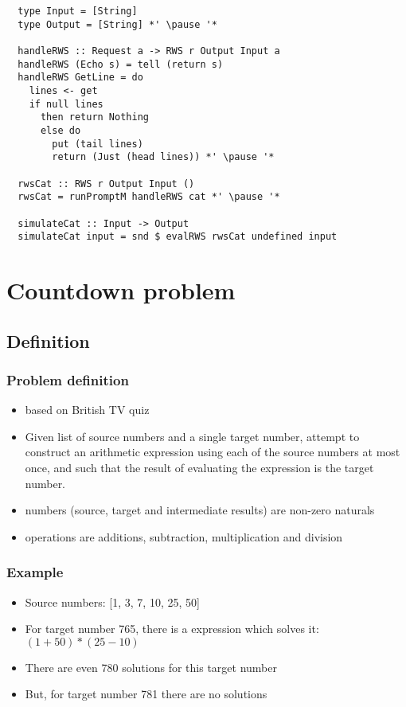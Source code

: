 \documentclass[aspectratio=43]{beamer}
\begin{document}
\begin{frame}[fragile]
 \begin{lstlisting}
  type Input = [String]
  type Output = [String] *' \pause '*

  handleRWS :: Request a -> RWS r Output Input a
  handleRWS (Echo s) = tell (return s)
  handleRWS GetLine = do
    lines <- get
    if null lines
      then return Nothing
      else do
        put (tail lines)
        return (Just (head lines)) *' \pause '*
  
  rwsCat :: RWS r Output Input ()
  rwsCat = runPromptM handleRWS cat *' \pause '*
  
  simulateCat :: Input -> Output
  simulateCat input = snd $ evalRWS rwsCat undefined input
 \end{lstlisting}
\end{frame}




    
    
    







\section{Countdown problem}

\subsection{Definition}

\begin{frame}
 \frametitle{Problem definition}
 \begin{itemize}
  \item based on British TV quiz
  \item Given list of source numbers and a single target number, attempt to construct an arithmetic expression using each of the source numbers at most once, and such that the result of evaluating the expression is the target number.
  \item numbers (source, target and intermediate results) are non-zero naturals
  \item operations are additions, subtraction, multiplication and division
 \end{itemize}
\end{frame}

\begin{frame}
 \frametitle{Example}
 \begin{itemize}
  \item Source numbers: [1, 3, 7, 10, 25, 50]
  \item For target number 765, there is a expression which solves it: $(1 + 50)*(25 - 10)$
  \item There are even 780 solutions for this target number
  \item But, for target number 781 there are no solutions
 \end{itemize}
\end{frame}
\end{document}
